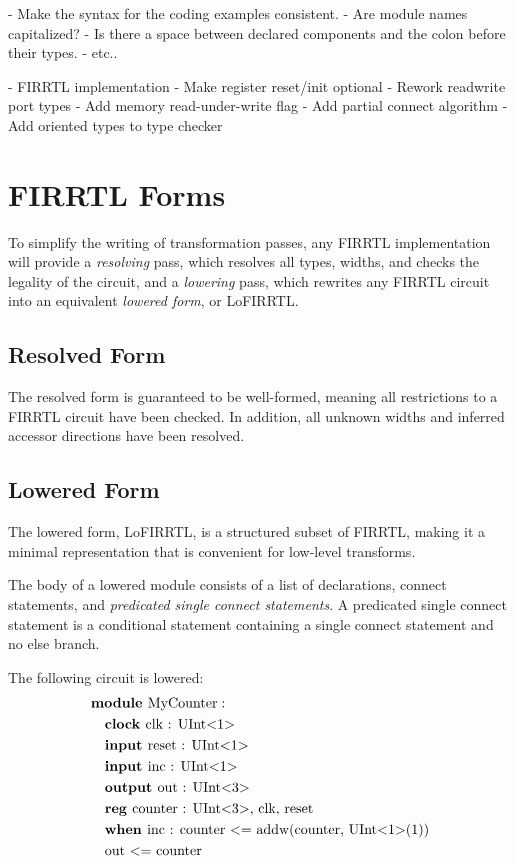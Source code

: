 \documentclass[12pt]{article}
\begin{document}
- Make the syntax for the coding examples consistent.
   - Are module names capitalized?
   - Is there a space between declared components and the colon before their types.
   - etc..

- FIRRTL implementation
   - Make register reset/init optional
   - Rework readwrite port types
   - Add memory read-under-write flag
   - Add partial connect algorithm
   - Add oriented types to type checker

\section{FIRRTL Forms}

To simplify the writing of transformation passes, any FIRRTL implementation will provide a {\em resolving} pass, which resolves all types, widths, and checks the legality of the circuit, and a {\em lowering} pass, which rewrites any FIRRTL circuit into an equivalent {\em lowered form}, or LoFIRRTL.

\subsection{Resolved Form}

The resolved form is guaranteed to be well-formed, meaning all restrictions to a FIRRTL circuit have been checked. In addition, all unknown widths and inferred accessor directions have been resolved.

\subsection{Lowered Form}

The lowered form, LoFIRRTL, is a structured subset of FIRRTL, making it a minimal representation that is convenient for low-level transforms. 

The body of a lowered module consists of a list of declarations, connect statements, and {\em predicated single connect statements}.
A predicated single connect statement is a conditional statement containing a single connect statement and no else branch.

The following circuit is lowered:
\[
\begin{aligned}
&\text{\bf module\ } \text{MyCounter} :                              \\
&\quad \text{\bf clock\ } \text{clk : UInt$<$1$>$}                        \\
&\quad \text{\bf input\ } \text{reset : UInt$<$1$>$}                        \\
&\quad \text{\bf input\ } \text{inc : UInt$<$1$>$}                           \\
&\quad \text{\bf output\ } \text{out : UInt$<$3$>$}                         \\
&\quad \text{\bf reg\ } \text{counter : UInt$<$3$>$, clk, reset} \\
&\quad \text{\bf when\ } \text{inc : counter $<$= addw(counter, UInt$<$1$>$(1))}   \\
&\quad \text{out $<$= counter}  \\
\end{aligned}
\]
\end{document}
